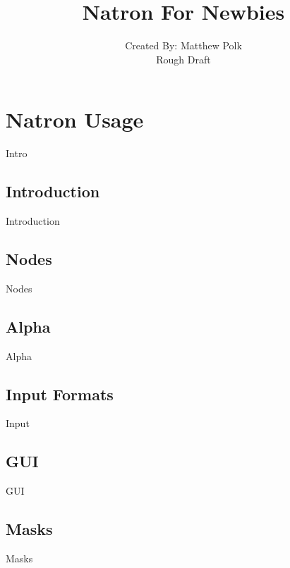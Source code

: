 \documentclass[10pt,oneside,openany,letterpaper]{memoir}
\title{Natron For Newbies}
\author{Created By: Matthew Polk\\Rough Draft}
\date{}
\begin{document}
\maketitle

\newpage
\tableofcontents*
\pagestyle{empty}


\cleardoublepage

%
\setcounter{page}{1}
\pagestyle{plain}

\part{Natron Usage}

Intro

\chapter{Introduction}
Introduction

\chapter{Nodes}

Nodes

\chapter{Alpha}
Alpha

\chapter{Input Formats}
Input

\chapter{GUI}
GUI

\chapter{Masks}
Masks
\end{document}
